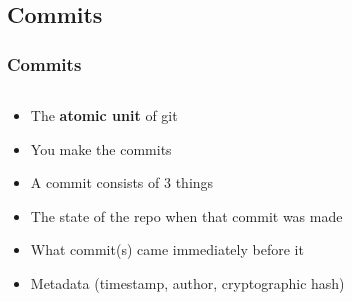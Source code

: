 \documentclass{beamer}
\begin{document}
\subsection{Commits}
\begin{frame}
    \frametitle{Commits}

    \begin{columns}
        \begin{column}{0.5\textwidth}
            \begin{itemize}[<+->]
                \item The \textbf{atomic unit} of git
                \item You make the commits
                \item A commit consists of 3 things
                \item The state of the repo when that commit was made
                \item What commit(s) came immediately before it
                \item Metadata (timestamp, author, cryptographic hash)
            \end{itemize}
        \end{column}
        \begin{column}{0.5\textwidth}
        \end{column}
    \end{columns}
\end{frame}
\end{document}
